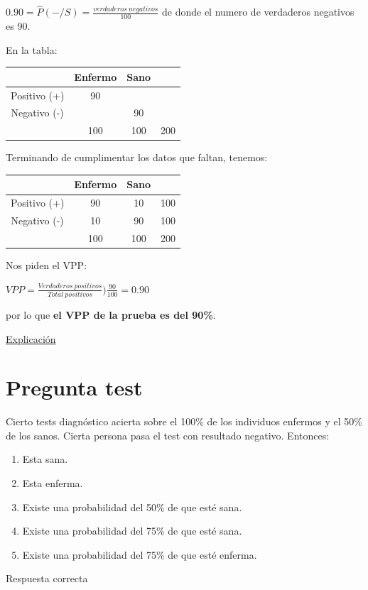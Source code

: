 \documentclass[
]{book}
\providecommand{\tightlist}{%
  \setlength{\itemsep}{0pt}\setlength{\parskip}{0pt}}
\begin{document}
\(0.90 = \hat{P}(-/S) = \frac{verdaderos ~ negativos}{100}\) de donde el numero de verdaderos negativos es 90.

En la tabla:

\begin{longtable}[]{@{}cccc@{}}
\toprule
& Enfermo & Sano &\tabularnewline
\midrule
\endhead
Positivo (+) & 90 & &\tabularnewline
Negativo (-) & & 90 &\tabularnewline
& 100 & 100 & 200\tabularnewline
\bottomrule
\end{longtable}

Terminando de cumplimentar los datos que faltan, tenemos:

\begin{longtable}[]{@{}cccc@{}}
\toprule
& Enfermo & Sano &\tabularnewline
\midrule
\endhead
Positivo (+) & 90 & 10 & 100\tabularnewline
Negativo (-) & 10 & 90 & 100\tabularnewline
& 100 & 100 & 200\tabularnewline
\bottomrule
\end{longtable}

Nos piden el VPP:

\(VPP=\frac{Verdaderos ~ positivos}{Total ~ positivos})\frac{90}{100}=0.90\)

por lo que \textbf{el VPP de la prueba es del 90\%}.

\href{https://1fjmanzano.github.io/bioestadistica/relaci\%C3\%B3n-entre-variables-cualitativas.html\#diagno\%CC\%81stico-cli\%CC\%81nico}{Explicación}

\hypertarget{pregunta-test-113}{%
\section{Pregunta test}\label{pregunta-test-113}}

Cierto tests diagnóstico acierta sobre el 100\% de los individuos enfermos y el 50\% de los sanos. Cierta persona pasa el test con resultado negativo. Entonces:

\begin{enumerate}
\def\labelenumi{\alph{enumi})}
\tightlist
\item
  Esta sana.
\item
  Esta enferma.
\item
  Existe una probabilidad del 50\% de que esté sana.
\item
  Existe una probabilidad del 75\% de que esté sana.
\item
  Existe una probabilidad del 75\% de que esté enferma.
\end{enumerate}

Respuesta correcta
\end{document}
